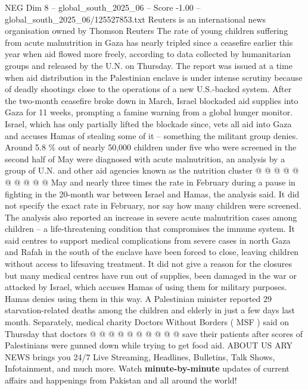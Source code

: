 \begin{textsample}{NEG Dim 8 – global\_south\_2025\_06 – Score -1.00 – global\_south\_2025\_06/125527853.txt}  \label{ex:f8_neg_252}
Reuters is an international news organisation owned by Thomson Reuters The rate of young children suffering from acute malnutrition in Gaza has nearly tripled since a ceasefire earlier this year when aid flowed more freely, according to data collected by humanitarian groups and released by the U.N. on Thursday.
The report was issued at a time when aid distribution in the Palestinian enclave is under intense scrutiny because of deadly shootings close to the operations of a new U.S.-backed system.
After the two-month ceasefire broke down in March, Israel blockaded aid supplies into Gaza for 11 weeks, prompting a famine warning from a global hunger monitor.
Israel, which has only partially lifted the blockade since, vets all aid into Gaza and accuses Hamas of stealing some of it -- something the militant group denies.
Around 5.8 \% out of nearly 50,000 children under five who were screened in the second half of May were diagnosed with acute malnutrition, an analysis by a group of U.N. and other aid agencies known as the nutrition cluster @ @ @ @ @ @ @ @ @ @ May and nearly three times the rate in February during a pause in fighting in the 20-month war between Israel and Hamas, the analysis said.
It did not specify the exact rate in February, nor say how many children were screened.
The analysis also reported an increase in severe acute malnutrition cases among children -- a life-threatening condition that compromises the immune system.
It said centres to support medical complications from severe cases in north Gaza and Rafah in the south of the enclave have been forced to close, leaving children without access to lifesaving treatment.
It did not give a reason for the closures but many medical centres have run out of supplies, been damaged in the war or attacked by Israel, which accuses Hamas of using them for military purposes.
Hamas denies using them in this way.
A Palestinian minister reported 29 starvation-related deaths among the children and elderly in just a few days last month.
Separately, medical charity Doctors Without Borders ( MSF ) said on Thursday that doctors @ @ @ @ @ @ @ @ @ @ save their patients after scores of Palestinians were gunned down while trying to get food aid.
ABOUT US ARY NEWS brings you 24/7 Live Streaming, Headlines, Bulletins, Talk Shows, Infotainment, and much more.
Watch \textbf{minute-by-minute} updates of current affairs and happenings from Pakistan and all around the world!

\end{textsample}
